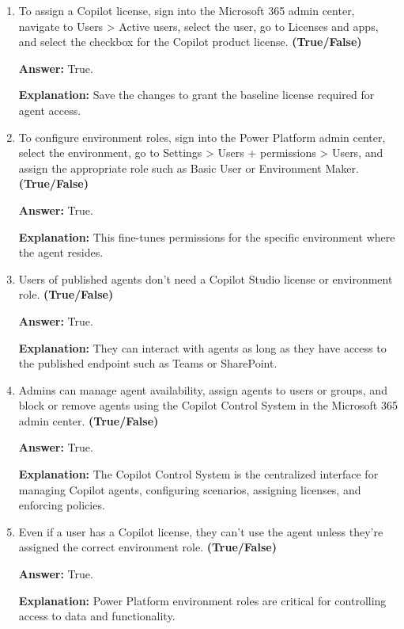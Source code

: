 \documentclass[10pt]{article}
\begin{document}
\begin{enumerate}[leftmargin=*]
\textbf{Explanation:} This strengthens security when managing agent access.

\item To assign a Copilot license, sign into the Microsoft 365 admin center, navigate to Users > Active users, select the user, go to Licenses and apps, and select the checkbox for the Copilot product license. \textbf{(True/False)}

\textbf{Answer:} True.

\textbf{Explanation:} Save the changes to grant the baseline license required for agent access.

\item To configure environment roles, sign into the Power Platform admin center, select the environment, go to Settings > Users + permissions > Users, and assign the appropriate role such as Basic User or Environment Maker. \textbf{(True/False)}

\textbf{Answer:} True.

\textbf{Explanation:} This fine-tunes permissions for the specific environment where the agent resides.

\item Users of published agents don’t need a Copilot Studio license or environment role. \textbf{(True/False)}

\textbf{Answer:} True.

\textbf{Explanation:} They can interact with agents as long as they have access to the published endpoint such as Teams or SharePoint.

\item Admins can manage agent availability, assign agents to users or groups, and block or remove agents using the Copilot Control System in the Microsoft 365 admin center. \textbf{(True/False)}

\textbf{Answer:} True.

\textbf{Explanation:} The Copilot Control System is the centralized interface for managing Copilot agents, configuring scenarios, assigning licenses, and enforcing policies.

\item Even if a user has a Copilot license, they can’t use the agent unless they’re assigned the correct environment role. \textbf{(True/False)}

\textbf{Answer:} True.

\textbf{Explanation:} Power Platform environment roles are critical for controlling access to data and functionality.


\end{enumerate}
\end{document}
